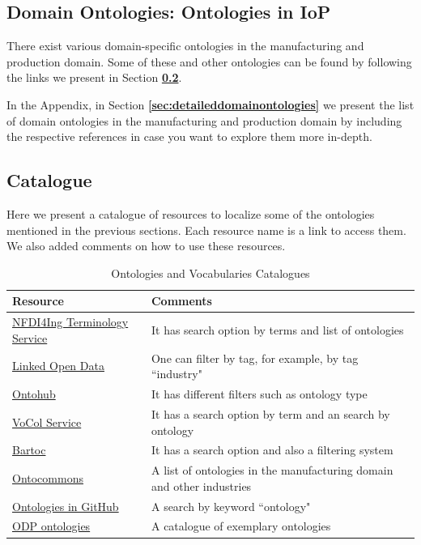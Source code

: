 \documentclass{guideline/sty/rapport}
\begin{document}
\newpage
\subsection{Domain Ontologies: Ontologies in IoP}
\label{sec:domainontologies}

There exist various domain-specific ontologies in the manufacturing and production domain. Some of these and other ontologies can be found by following the links we present in Section \textbf{\ref{sec:catalogues}}. \singlespacing

In the Appendix, in Section \textbf{\ref{sec:detaileddomainontologies}} we present the list of domain ontologies in the manufacturing and production domain by including the respective references in case you want to explore them more in-depth.

\subsection{Catalogue}
\label{sec:catalogues}

Here we present a catalogue of resources to localize some of the ontologies mentioned in the previous sections. Each resource name is a link to access them. We also added comments on how to use these resources.

\begin{table}[H]
	\centering
	\begin{tabular}{L{.35\textwidth} L{.65\textwidth}}
		\hline
		\textbf{Resource} & \textbf{Comments} \\
		\hline
		\href{https://terminology.nfdi4ing.de/ts4ing/index}{NFDI4Ing Terminology Service} & It has search option by terms and list of ontologies\\
		\href{https://lov.linkeddata.es/dataset/lov}{Linked Open Data} & One can filter by tag, for example, by tag ``industry" \\
        \href{https://ontohub.org/ontologies}{Ontohub} & It has different filters such as ontology type \\
        \href{https://www.vocoreg.com}{VoCol Service} & It has a search option by term and an search by ontology \\
        \href{https://bartoc.org/vocabularies}{Bartoc} & It has a search option and also a filtering system \\
        \href{https://data.ontocommons.linkeddata.es/index}{Ontocommons} & A list of ontologies in the manufacturing domain and other industries \\
        \href{https://github.com/search?q=ontology}{Ontologies in GitHub} & A search by keyword ``ontology" \\
        \href{http://ontologydesignpatterns.org/wiki/Ontology:Main}{ODP ontologies} & A catalogue of exemplary ontologies \\
		\hline
	\end{tabular}
    \caption{Ontologies and Vocabularies Catalogues} 
	\label{tab:catalogs}
\end{table}
\end{document}
